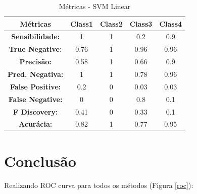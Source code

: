 \documentclass[
	article,			%
	11pt,				%
	oneside,			%
	a4paper,			%
	english,			%
	brazil,				%
	sumario=tradicional
	]{abntex2}
\begin{document}
\begin{table}[]
\centering
\begin{tabular}{|c|c|c|c|c|}
\hline
\textbf{Métricas}        & \textbf{Class1} & \textbf{Class2} & \textbf{Class3} & \textbf{Class4} \\ \hline
\textbf{Sensibilidade:}  & 1               & 1               & 0.2             & 0.9             \\ \hline
\textbf{True Negative:}  & 0.76            & 1               & 0.96            & 0.96            \\ \hline
\textbf{Precisão:}       & 0.58            & 1               & 0.66            & 0.9             \\ \hline
\textbf{Pred. Negativa:} & 1               & 1               & 0.78            & 0.96            \\ \hline
\textbf{False Positive:} & 0.2             & 0               & 0.03            & 0.03            \\ \hline
\textbf{False Negative:} & 0               & 0               & 0.8             & 0.1             \\ \hline
\textbf{F Discovery:}    & 0.41            & 0               & 0.33            & 0.1             \\ \hline
\textbf{Acurácia:}       & 0.82            & 1               & 0.77            & 0.95            \\ \hline
\end{tabular}
\caption{Métricas - SVM Linear}
\label{tab:metrics_svm}
\end{table}



\section{Conclusão}

Realizando ROC curva para todos os métodos (Figura \ref{roc}):
\end{document}
